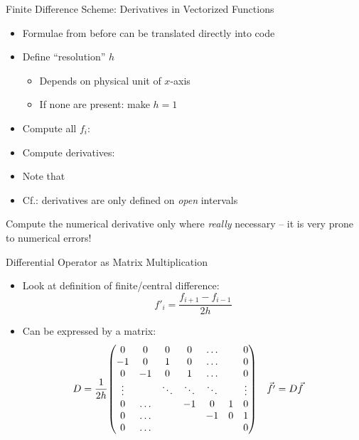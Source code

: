 \begin{frame}[fragile]{Finite Difference Scheme: Derivatives in Vectorized Functions}
%
\begin{itemize}
\item Formulae from before can be translated directly into code
\item Define \enquote{resolution} $h$
	\begin{itemize}
	\item Depends on physical unit of $x$-axis
	\item If none are present: make $h = 1$
	\end{itemize}
\item Compute all $f_i$:\\
\item Compute derivatives:\\
\item Note that 
\item Cf.: derivatives are only defined on \emph{open} intervals
\end{itemize}
%
\begin{hintbox}
\small
Compute the numerical derivative only where \emph{really} necessary -- it is very prone to numerical errors!
\end{hintbox}
%
\end{frame}


\begin{frame}{Differential Operator as Matrix Multiplication}
%
\begin{itemize}
\item Look at definition of finite/central difference:
	\[f'_i = \frac{f_{i+1} - f_{i-1}}{2h}\]
\item Can be expressed by a matrix:
	\begin{align*}
		D
	&=
		\frac{1}{2h}
		\mqty(
			   0   &    0    &    0   &    0   & \ldots &    &   0 \\
			  -1   &    0    &    1   &    0   & \ldots &    &   0 \\
			   0   &   -1    &    0   &    1   & \ldots &    &   0 \\
			\vdots &         & \ddots & \ddots & \ddots &    & \vdots \\
			   0   & \ldots  &  &           -1 &      0 &  1 &   0 \\
			   0   & \ldots  &  &              &     -1 &  0 &   1 \\
			   0   & \ldots  &  &              &        &    &   0
		)
	&
			\vec{f'}
		&=
			D\vec{f}
	\end{align*}
\end{itemize}
%
\end{frame}

